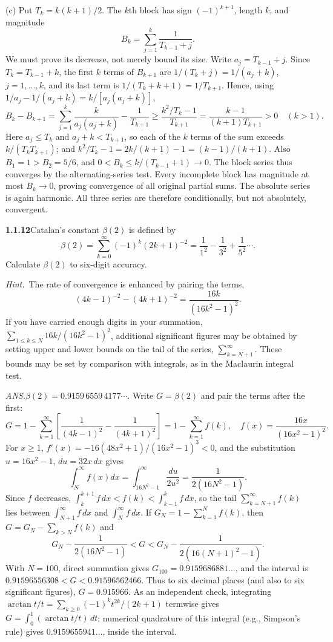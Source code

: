 (c) Put $T_k=k(k+1)/2$. The $k$th block has sign $(-1)^{k+1}$,
length $k$, and magnitude
\[
 B_k=\sum_{j=1}^k\frac1{T_{k-1}+j}.
\]
We must prove its decrease, not merely bound its size. Write
$a_j=T_{k-1}+j$. Since $T_k=T_{k-1}+k$, the first $k$ terms of
$B_{k+1}$ are $1/(T_k+j)=1/(a_j+k)$, $j=1,\ldots,k$, and its last term is
$1/(T_k+k+1)=1/T_{k+1}$. Hence, using
$1/a_j-1/(a_j+k)=k/[a_j(a_j+k)]$,
\[
 B_k-B_{k+1}
 =\sum_{j=1}^k\frac{k}{a_j(a_j+k)}-\frac1{T_{k+1}}
 \ge\frac{k^2/T_k-1}{T_{k+1}}
 =\frac{k-1}{(k+1)T_{k+1}}>0\quad(k>1).
\]
Here $a_j\le T_k$ and $a_j+k<T_{k+1}$, so each of the $k$ terms of the
sum exceeds $k/(T_kT_{k+1})$; and $k^2/T_k-1=2k/(k+1)-1=(k-1)/(k+1)$.
Also $B_1=1>B_2=5/6$,
and $0<B_k\le k/(T_{k-1}+1)\to0$. The block series thus converges
by the alternating-series test. Every incomplete block has magnitude
at most $B_k\to0$, proving convergence of all original partial sums.
The absolute series is again harmonic. All three series are therefore
conditionally, but not absolutely, convergent.


\par\bigskip
\noindent\textbf{1.1.12}\quad Catalan's constant $\beta(2)$ is defined by
\[
\beta(2)=\sum_{k=0}^{\infty}(-1)^{k}(2k+1)^{-2}
=\frac{1}{1^{2}}-\frac{1}{3^{2}}+\frac{1}{5^{2}}\cdots.
\]
Calculate $\beta(2)$ to six-digit accuracy.

\emph{Hint.}~The rate of convergence is enhanced by pairing the terms,
\[
(4k-1)^{-2}-(4k+1)^{-2}=\frac{16k}{(16k^{2}-1)^{2}}.
\]
If you have carried enough digits in your summation,
$\sum_{1\leq k\leq N}16k/(16k^{2}-1)^{2}$, additional significant figures may
be obtained by setting upper and lower bounds on the tail of the series,
$\sum_{k=N+1}^{\infty}$. These bounds may be set by comparison with integrals,
as in the Maclaurin integral test.
\par\nobreak\hfill\emph{ANS.}\enspace $\beta(2)=0.9159\,6559\,4177\cdots$.
\solution
Write $G=\beta(2)$ and pair the terms after the first:
\[
 G=1-\sum_{k=1}^\infty\left[\frac1{(4k-1)^2}-\frac1{(4k+1)^2}\right]
  =1-\sum_{k=1}^\infty f(k),\quad
 f(x)=\frac{16x}{(16x^2-1)^2}.
\]
For $x\ge1$,
$f'(x)=-16(48x^2+1)/(16x^2-1)^3<0$, and the substitution
$u=16x^2-1$, $du=32x\,dx$ gives
\[
 \int_N^\infty f(x)dx=\int_{16N^2-1}^\infty\frac{du}{2u^2}
 =\frac1{2(16N^2-1)}.
\]
Since $f$ decreases, $\int_k^{k+1}f\,dx<f(k)<\int_{k-1}^kf\,dx$, so the tail
$\sum_{k=N+1}^\infty f(k)$ lies between $\int_{N+1}^\infty f\,dx$ and
$\int_N^\infty f\,dx$. If $G_N=1-\sum_{k=1}^N f(k)$, then $G=G_N-\sum_{k>N}f(k)$ and
\[
 G_N-\frac1{2(16N^2-1)}<G<
 G_N-\frac1{2(16(N+1)^2-1)}.
\]
With $N=100$, direct summation gives $G_{100}=0.9159686881\ldots$, and the
interval is $0.91596556308<G<0.91596562466$. Thus to six decimal places
(and also to six significant figures), $\boxed{G=0.915966}$.
As an independent check, integrating
$\arctan t/t=\sum_{k\ge0}(-1)^kt^{2k}/(2k+1)$ termwise gives
$G=\int_0^1(\arctan t/t)\,dt$; numerical quadrature of this integral
(e.g., Simpson's rule) gives $0.9159655941\ldots$, inside the interval.


